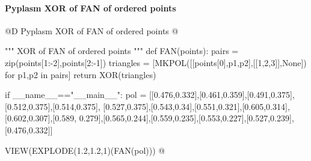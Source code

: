 \documentclass[11pt,oneside]{article}    %
\begin{document}
\paragraph{Pyplasm XOR of FAN of ordered points}

@D Pyplasm XOR of FAN of ordered points
@{""" XOR of FAN of ordered points """ 
def FAN(points): 
    pairs = zip(points[1:-2],points[2:-1])
    triangles = [MKPOL([[points[0],p1,p2],[[1,2,3]],None]) for p1,p2 in pairs]
    return XOR(triangles)
 
if __name__=="__main__":
    pol = [[0.476,0.332],[0.461,0.359],[0.491,0.375],[0.512,0.375],[0.514,0.375],
    [0.527,0.375],[0.543,0.34],[0.551,0.321],[0.605,0.314],[0.602,0.307],[0.589,
    0.279],[0.565,0.244],[0.559,0.235],[0.553,0.227],[0.527,0.239],[0.476,0.332]]

    VIEW(EXPLODE(1.2,1.2,1)(FAN(pol)))
@}




\end{document}

